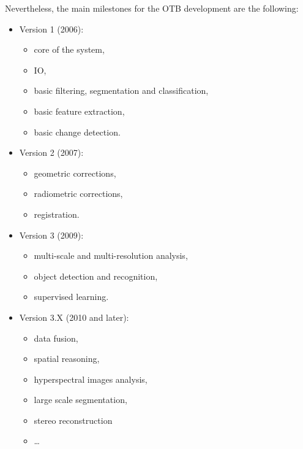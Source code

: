 Nevertheless, the main milestones for the OTB development are the
following:
\begin{itemize}
  \item{Version 1 (2006):}
    \begin{itemize}
    \item core of the system,
    \item IO,
    \item basic filtering, segmentation and classification,
    \item basic feature extraction,
    \item basic change detection.
    \end{itemize}
    \item{Version 2 (2007):}
      \begin{itemize}
      \item geometric corrections,
      \item radiometric corrections,
      \item registration.
      \end{itemize}
    \item{Version 3 (2009):}
      \begin{itemize}
      \item multi-scale and multi-resolution analysis,
      \item object detection and recognition,
      \item supervised learning.
      \end{itemize}
    \item{Version 3.X (2010 and later):}
      \begin{itemize}
	\item data fusion,
	\item spatial reasoning,
        \item hyperspectral images analysis,
        \item large scale segmentation,
        \item stereo reconstruction
        \item \ldots
      \end{itemize}

\end{itemize}

